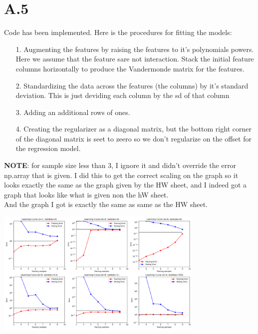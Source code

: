 \documentclass[]{article}
\begin{document}
    \section*{A.5}
        Code has been implemented. Here is the procedures for fitting the models: 
        \begin{enumerate}
        \item[1.] Augmenting the features by raising the features to it's polynomials powers. Here we assume that the feature sare not interaction. Stack the initial feature columns horizontally to produce the Vandermonde matrix for the features. 
        \item[2.] Standardizing the data across the features (the columns) by it's standard deviation. This is just deviding each column by the sd of that column  
        \item[3.] Adding an additional rows of ones. 
        \item[4.] Creating the regularizer as a diagonal matrix, but the bottom right corner of the diagonal matrix is seet to zeero so we don't regularize on the offset for the regression model.  
        \end{enumerate}
        \label{lst:A.5.1}
        \textbf{NOTE}: for sample size less than 3, I ignore it and didn't override the error np.array that is given. I did this to get the correct scaling on the graph so it looks exactly the same as the graph given by the HW sheet, and I indeed got a graph that looks like what is given non the hW sheet.
        \\
        And the graph I got is exactly the same as same as the HW sheet. 
        \begin{center}
            \includegraphics[width=10cm]{myplot.png}    
        \end{center}
\end{document}
